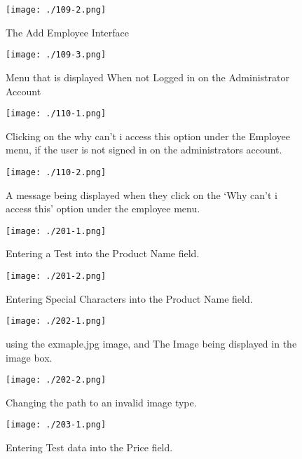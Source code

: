 \begin{figure}[H]
    \texttt{[image: ./109-2.png]}
    \caption{The Add Employee Interface} \label{fig:109-2}
\end{figure}

\begin{figure}[H]
    \texttt{[image: ./109-3.png]}
    \caption{Menu that is displayed When not Logged in on the Administrator Account} \label{fig:109-3}
\end{figure}

\begin{figure}[H]
    \texttt{[image: ./110-1.png]}
    \caption{Clicking on the why can't i access this option under the Employee menu, if the user is not signed in on the administrators account.} \label{fig:110-1}
\end{figure}

\begin{figure}[H]
    \texttt{[image: ./110-2.png]}
    \caption{A message being displayed when they click on the `Why can't i access this' option under the employee menu.} \label{fig:110-2}
\end{figure}

\begin{figure}[H]
    \texttt{[image: ./201-1.png]}
    \caption{Entering a Test into the Product Name field.} \label{fig:201-1}
\end{figure}

\begin{figure}[H]
    \texttt{[image: ./201-2.png]}
    \caption{Entering Special Characters into the Product Name field.} \label{fig:201-2}
\end{figure}

\begin{figure}[H]
    \texttt{[image: ./202-1.png]}
    \caption{using the exmaple.jpg image, and The Image being displayed in the image box.} \label{fig:202-1}
\end{figure}

\begin{figure}[H]
    \texttt{[image: ./202-2.png]}
    \caption{Changing the path to an invalid image type.} \label{fig:202-2}
\end{figure}

\begin{figure}[H]
    \texttt{[image: ./203-1.png]}
    \caption{Entering Test data into the Price field.} \label{fig:203-1}
\end{figure}

